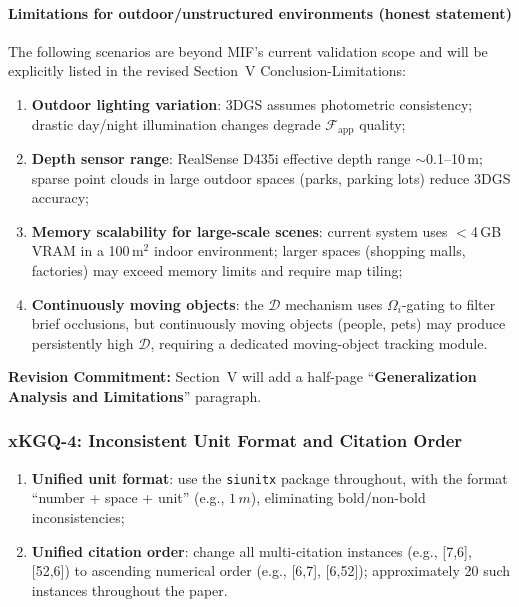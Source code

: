 \documentclass[10pt,a4paper]{article}
\newcommand{\commitbox}[1]{\smallskip\noindent\textbf{Revision Commitment:} #1\smallskip}
\begin{document}
\paragraph{Limitations for outdoor/unstructured environments (honest statement)}
The following scenarios are beyond MIF's current validation scope and will be explicitly listed in the revised Section~V Conclusion-Limitations:
\begin{enumerate}[leftmargin=2em,topsep=2pt,itemsep=0pt]
  \item \textbf{Outdoor lighting variation}: 3DGS assumes photometric consistency; drastic day/night illumination changes degrade $\mathcal{F}_{\text{app}}$ quality;
  \item \textbf{Depth sensor range}: RealSense D435i effective depth range ${\sim}$0.1--10\,m; sparse point clouds in large outdoor spaces (parks, parking lots) reduce 3DGS accuracy;
  \item \textbf{Memory scalability for large-scale scenes}: current system uses $<$4\,GB VRAM in a 100\,m$^2$ indoor environment; larger spaces (shopping malls, factories) may exceed memory limits and require map tiling;
  \item \textbf{Continuously moving objects}: the $\mathcal{D}$ mechanism uses $\Omega_i$-gating to filter brief occlusions, but continuously moving objects (people, pets) may produce persistently high $\mathcal{D}$, requiring a dedicated moving-object tracking module.
\end{enumerate}

\commitbox{Section~V will add a half-page ``\textbf{Generalization Analysis and Limitations}'' paragraph.}

\subsubsection*{xKGQ-4: Inconsistent Unit Format and Citation Order}

\begin{enumerate}[leftmargin=2em,topsep=2pt,itemsep=1pt]
  \item \textbf{Unified unit format}: use the \texttt{siunitx} package throughout, with the format ``number + space + unit'' (e.g., $1\,m$), eliminating bold/non-bold inconsistencies;
  \item \textbf{Unified citation order}: change all multi-citation instances (e.g., [7,6], [52,6]) to ascending numerical order (e.g., [6,7], [6,52]); approximately 20 such instances throughout the paper.
\end{enumerate}
\end{document}

